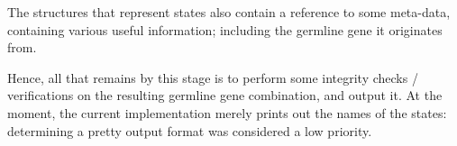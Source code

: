 The structures that represent states also contain a reference to some meta-data, containing various useful information; including the germline gene it originates from.

Hence, all that remains by this stage is to perform some integrity checks / verifications on the resulting germline gene combination, and output it. At the moment, the current implementation merely prints out the names of the states: determining a pretty output format was considered a low priority.


